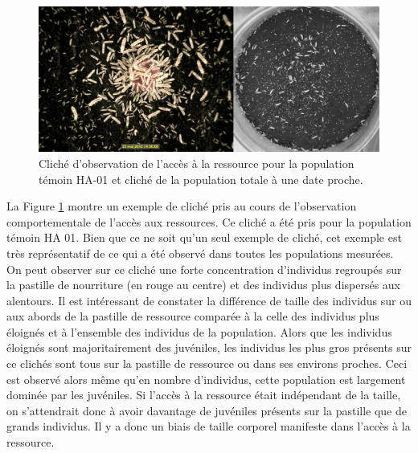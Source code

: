 \begin{figure}[!ht]
\begin{center}
\includegraphics[width=1\textwidth]{1_CorpsDeThese/Resumes/Fig/SM05b}
\caption[Cliché
d'observation de l'accès à la ressource]{Cliché
d'observation de l'accès à la ressource pour la population témoin HA-01 et
cliché de la population totale à une date proche.}
\label{fig:SM5}
\end{center}
\end{figure}

La Figure \ref{fig:SM5} montre un exemple de cliché pris au cours de
l'observation comportementale de l'accès aux ressources. Ce cliché a été pris
pour la population témoin HA 01. Bien que ce ne soit qu'un seul exemple de
cliché, cet exemple est très représentatif de ce qui a été observé dans toutes
les populations mesurées. On peut observer sur ce cliché une forte concentration
d'individus regroupés sur la pastille de nourriture (en rouge au centre) et des
individus plus dispersés aux alentours. Il est intéressant de constater la
différence de taille des individus sur ou aux abords de la pastille de ressource
comparée à la celle des individus plus éloignés et à l'ensemble des individus de
la population. Alors que les individus éloignés sont majoritairement des
juvéniles, les individus les plus gros présents sur ce clichés sont tous sur la
pastille de ressource ou dans ses environs proches.
Ceci est observé alors même qu'en nombre d'individus, cette population est
largement dominée par les juvéniles. Si l'accès à la ressource était indépendant
de la taille, on s'attendrait donc à avoir davantage de juvéniles présents sur
la pastille que de grands individus. Il y a donc un biais de taille corporel
manifeste dans l'accès à la ressource.

